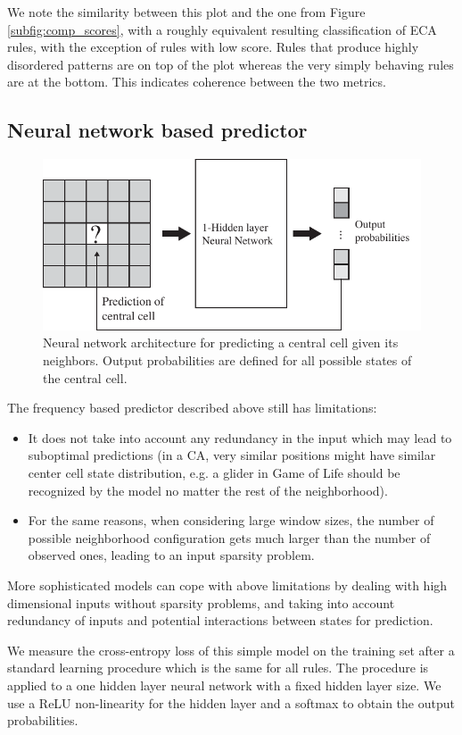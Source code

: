 We note the similarity between this plot and the one from Figure
\ref{subfig:comp_scores}, with a roughly equivalent resulting classification of
ECA rules, with the exception of rules with low score. Rules that produce highly
disordered patterns are on top of the plot whereas the very simply behaving
rules are at the bottom. This indicates coherence between the two metrics.

\subsection{Neural network based predictor}

\begin{figure}[htbp]
  \centering
  \includegraphics[width=.7\linewidth]{figures/nn_archi}
  \caption{Neural network architecture for predicting a central cell given its
    neighbors. Output probabilities are defined for all possible states of the
    central cell.}
  \label{fig:nn_archi}
\end{figure}

The frequency based predictor described above still has limitations:
\begin{itemize}
\item It does not take into account any redundancy in the input which may lead to
  suboptimal predictions (in a CA, very similar positions might have similar
  center cell state distribution, e.g. a glider in Game of Life should be
  recognized by the model no matter the rest of the neighborhood).
\item For the same reasons, when considering large window sizes, the number of
  possible neighborhood configuration gets much larger than the number of
  observed ones, leading to an input sparsity problem.
\end{itemize}
More sophisticated models can cope with above limitations by dealing with high
dimensional inputs without sparsity problems, and taking into account redundancy
of inputs and potential interactions between states for prediction.

We measure the cross-entropy loss of this simple model on the training set after
a standard learning procedure which is the same for all rules. The procedure is
applied to a one hidden layer neural network with a fixed hidden layer size. We
use a ReLU non-linearity for the hidden layer and a softmax to obtain the output
probabilities.

